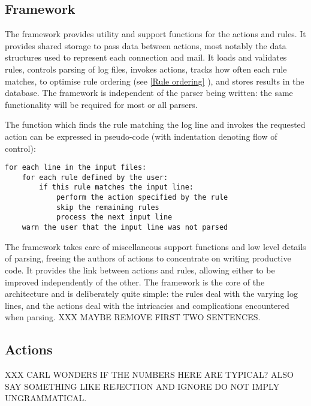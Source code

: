 \documentclass[draft]{svmult}
\newcommand{\sectionref}[1]{%
    \textsection{}\vref*{#1}%
}
\begin{document}
\subsection{Framework}

\label{Framework}

The framework provides utility and support functions for the actions and
rules.  It provides shared storage to pass data between actions, most
notably the data structures used to represent each connection and mail.  It
loads and validates rules, controls parsing of log files, invokes actions,
tracks how often each rule matches, to optimise rule ordering (see
\sectionref{Rule ordering}), and stores results in the database.  The
framework is independent of the parser being written: the same
functionality will be required for most or all parsers.

The function which finds the rule matching the log line and invokes the
requested action can be expressed in pseudo-code (with indentation denoting
flow of control):


\begin{verbatim}
for each line in the input files: 
    for each rule defined by the user: 
        if this rule matches the input line:
            perform the action specified by the rule
            skip the remaining rules
            process the next input line
    warn the user that the input line was not parsed
\end{verbatim}

The framework takes care of miscellaneous support functions and low level
details of parsing, freeing the authors of actions to concentrate on
writing productive code.  It provides the link between actions and rules,
allowing either to be improved independently of the other.  The framework
is the core of the architecture and is deliberately quite simple: the rules
deal with the varying log lines, and the actions deal with the intricacies
and complications encountered when parsing.  XXX MAYBE REMOVE FIRST TWO
SENTENCES\@.

\subsection{Actions}

\label{Actions}

XXX CARL WONDERS IF THE NUMBERS HERE ARE TYPICAL\@?  ALSO SAY SOMETHING
LIKE REJECTION AND IGNORE DO NOT IMPLY UNGRAMMATICAL\@.
\end{document}

